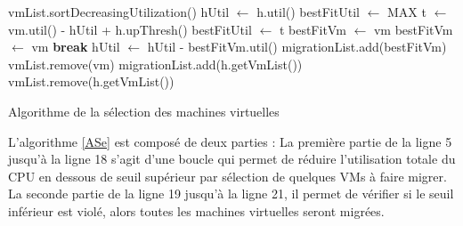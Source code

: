 \begin{onehalfspace}
\begin{algorithm}[!h]
\LinesNumbered
{} 
\BlankLine
vmList.sortDecreasingUtilization()\;
{
	hUtil $\leftarrow$ h.util()\;
	bestFitUtil $\leftarrow$ MAX\;
	{
		{
			{
				t $\leftarrow$ vm.util() - hUtil + h.upThresh()\;
				{
					bestFitUtil $\leftarrow$ t\;
					bestFitVm $\leftarrow$ vm\;
				}
			}{
				{
					bestFitVm $\leftarrow$ vm\;
				}\textbf{break}\;
			}
		}
		hUtil $\leftarrow$ hUtil - bestFitVm.util()\;
		migrationList.add(bestFitVm)\;
		vmList.remove(vm)\;
	}
	{
		migrationList.add(h.getVmList())\;
		vmList.remove(h.getVmList())\;
	}
}
\;
\caption{Algorithme de la sélection des machines virtuelles}
\label{ASe}
\end{algorithm}
L’algorithme \ref{ASe} est composé de deux parties :
La première partie de la ligne 5 jusqu’à la ligne 18 s’agit d’une boucle qui permet de réduire l'utilisation totale du CPU en dessous de seuil supérieur par sélection de quelques VMs à faire migrer. 
La seconde partie de la ligne 19 jusqu’à la ligne 21, il permet de vérifier si le seuil inférieur est violé, alors toutes les machines virtuelles seront migrées.   
\end{onehalfspace}
